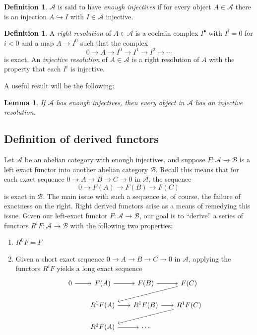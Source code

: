 \documentclass{article}
\def\~#1{\mathscr{#1}}
\numberwithin{equation}{section}
\numberwithin{figure}{section}
\newcommand{\mono}{\hookrightarrow}
\theoremstyle{plain}
\newtheorem{lem}[thm]{Lemma}
\theoremstyle{definition}
\newtheorem{defn}[thm]{Definition}
\theoremstyle{remark}
\begin{document}
\begin{defn}
    $\~A$ is said to have \emph{enough injectives} if for every object $A \in \~A$ there is an injection $A \mono I$ with $I \in \~A$ injective.  
\end{defn}

\begin{defn}
    A \emph{right resolution} of $A \in \~A$ is a cochain complex $I^\bullet$ with $I^i = 0$ for $i < 0$ and a map $A \to I^0$ such that the complex 
    \[0 \to A \to I^0 \to I^1 \to I^2 \to \cdots\]
    is exact. An \emph{injective resolution} of $A \in \~A$ is a right resolution of $A$ with the property that each $I^i$ is injective.
\end{defn}
A useful result will be the following:
\begin{lem}
    If $\~A$ has enough injectives, then every object in $\~A$ has an injective resolution.
\end{lem}

\subsection{Definition of derived functors}
Let $\~A$ be an abelian category with enough injectives, and suppose $F: \~A \to \~B$ is a left exact functor into another abelian category $\~B$. Recall this means that for each exact sequence $0 \to A \to B \to C \to 0$ in $\~A$, the sequence
\[0 \to F(A) \to F(B) \to F(C)\]
is exact in $\~B$. The main issue with such a sequence is, of course, the failure of exactness on the right. Right derived functors arise as a means of remedying this issue. Given our left-exact functor $F: \~A \to \~B$, our goal is to ``derive'' a series of functors $R^iF : \~A \to \~B$ with the following two properties:
\begin{enumerate}
    \item $R^0F = F$
    \item Given a short exact sequence $0 \to A \to B \to C \to 0$ in $\~A$, applying the functors $R^iF$ yields a long exact sequence
    \begin{equation}\label{eq:right_derived_les1}\begin{tikzcd}[sep = scriptsize]
    0 & F(A) & F(B) & F(C) \\
    & {R^1F(A)} & {R^1F(B)} & {R^1F(C)} \\
    & {R^2F(A)} & \cdots
    \arrow[from=1-1, to=1-2]
    \arrow[from=1-2, to=1-3]
    \arrow[from=1-3, to=1-4]
    \arrow[from=1-4, to=2-2]
    \arrow[from=2-2, to=2-3]
    \arrow[from=2-3, to=2-4]
    \arrow[from=2-4, to=3-2]
    \arrow[from=3-2, to=3-3]
\end{tikzcd}\end{equation}
\end{enumerate}
\end{document}
